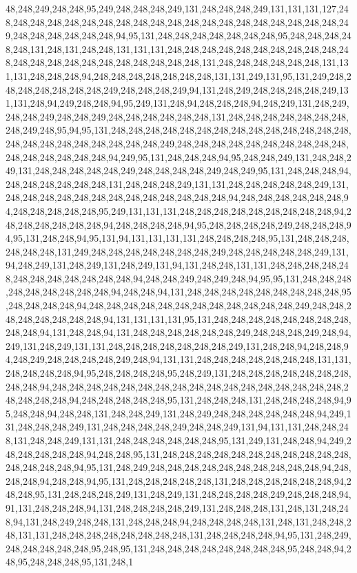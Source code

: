 48,248,249,248,248,95,249,248,248,248,249,131,248,248,248,249,131,131,131,127,248,248,248,248,248,248,248,248,248,248,248,248,248,248,248,248,248,248,248,248,249,248,248,248,248,248,248,94,95,131,248,248,248,248,248,248,248,95,248,248,248,248,248,131,248,131,248,248,131,131,131,248,248,248,248,248,248,248,248,248,248,248,248,248,248,248,248,248,248,248,248,248,248,131,248,248,248,248,248,248,131,131,131,248,248,248,94,248,248,248,248,248,248,248,131,131,249,131,95,131,249,248,248,248,248,248,248,248,249,248,248,248,249,94,131,248,249,248,248,248,248,249,131,131,248,94,249,248,248,94,95,249,131,248,94,248,248,248,94,248,249,131,248,249,248,248,249,248,248,249,248,248,248,248,248,248,131,248,248,248,248,248,248,248,248,249,248,95,94,95,131,248,248,248,248,248,248,248,248,248,248,248,248,248,248,248,248,248,248,248,248,248,248,248,249,248,248,248,248,248,248,248,248,248,248,248,248,248,248,248,248,94,249,95,131,248,248,248,94,95,248,248,249,131,248,248,249,131,248,248,248,248,248,249,248,248,248,248,249,248,249,95,131,248,248,248,94,248,248,248,248,248,248,131,248,248,248,249,131,131,248,248,248,248,248,249,131,248,248,248,248,248,248,248,248,248,248,248,248,248,94,248,248,248,248,248,248,94,248,248,248,248,248,95,249,131,131,131,248,248,248,248,248,248,248,248,248,94,248,248,248,248,248,248,94,248,248,248,248,94,95,248,248,248,248,249,248,248,248,94,95,131,248,248,94,95,131,94,131,131,131,131,248,248,248,248,95,131,248,248,248,248,248,248,131,249,248,248,248,248,248,248,248,249,248,248,248,248,248,249,131,94,248,249,131,248,249,131,248,249,131,94,131,248,248,131,131,248,248,248,248,248,248,248,248,248,248,248,248,94,248,248,249,248,249,248,94,95,95,131,248,248,248,248,248,248,248,248,248,94,248,248,94,131,248,248,248,248,248,248,248,248,248,95,248,248,248,248,94,248,248,248,248,248,248,248,248,248,248,248,248,249,248,248,248,248,248,248,248,248,94,131,131,131,131,95,131,248,248,248,248,248,248,248,248,248,248,94,131,248,248,94,131,248,248,248,248,248,248,249,248,248,248,249,248,94,249,131,248,249,131,131,248,248,248,248,248,248,248,249,131,248,248,94,248,248,94,248,249,248,248,248,248,249,248,94,131,131,248,248,248,248,248,248,248,131,131,248,248,248,248,94,95,248,248,248,248,95,248,249,131,248,248,248,248,248,248,248,248,248,94,248,248,248,248,248,248,248,248,248,248,248,248,248,248,248,248,248,248,248,248,248,94,248,248,248,248,248,95,131,248,248,248,131,248,248,248,248,94,95,248,248,94,248,248,131,248,248,249,131,248,249,248,248,248,248,248,248,94,249,131,248,248,248,249,131,248,248,248,248,249,248,248,249,131,94,131,131,248,248,248,131,248,248,249,131,131,248,248,248,248,248,248,95,131,249,131,248,248,94,249,248,248,248,248,248,94,248,248,95,131,248,248,248,248,248,248,248,248,248,248,248,248,248,248,248,94,95,131,248,249,248,248,248,248,248,248,248,248,248,248,94,248,248,248,94,248,248,94,95,131,248,248,248,248,248,131,248,248,248,248,248,248,94,248,248,95,131,248,248,248,249,131,248,249,131,248,248,248,248,249,248,248,248,94,91,131,248,248,248,94,131,248,248,248,248,249,131,248,248,248,131,248,131,248,248,94,131,248,249,248,248,131,248,248,248,94,248,248,248,248,131,248,131,248,248,248,131,131,248,248,248,248,248,248,248,248,131,248,248,248,248,94,95,131,248,249,248,248,248,248,248,95,248,95,131,248,248,248,248,248,248,248,248,95,248,248,94,248,95,248,248,248,95,131,248,1